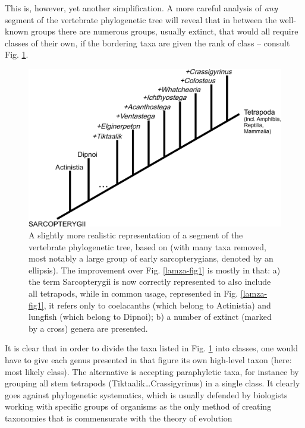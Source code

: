 \begin{artengenv}
This is, however, yet another simplification. A more careful analysis of \textit{any }segment of the vertebrate
phylogenetic tree will reveal that in between the well-known groups there are numerous groups, usually extinct, that
would all require classes of their own, if the bordering taxa are given the rank of class -- consult Fig. \ref{lamza-fig2}.

\begin{figure}[h]
	\centering
	\includegraphics[width=1\textwidth]{PAU_Lamza/Lamzaorg-img002.jpg}
	\caption{A slightly more realistic representation of a segment of the vertebrate phylogenetic tree, based on
		\parencite{swartz_marine_2012}
		(with many taxa removed, most notably a large group of early sarcopterygians,
		denoted by an ellipsis). The improvement over Fig. \ref{lamza-fig1} is mostly in that: a) the term Sarcopterygii is now correctly
		represented to also include all tetrapods, while in common usage, represented in Fig. \ref{lamza-fig1}, it refers only to coelacanths
		(which belong to Actinistia) and lungfish (which belong to Dipnoi); b) a number of extinct (marked by a cross) genera
		are presented.}
	\label{lamza-fig2}
\end{figure}

It is clear that in order to divide the taxa listed in Fig. \ref{lamza-fig2} into classes, one would have to give each genus presented
in that figure its own high-level taxon (here: most likely class). The alternative is accepting paraphyletic taxa, for
instance by grouping all stem tetrapods (Tiktaalik\ldots Crassigyrinus) in a single class. It clearly goes against
phylogenetic systematics, which is usually defended by biologists working with specific groups of organisms as the only
method of creating taxonomies that is commensurate with the theory of evolution
\parencite[see e.g.][]{williams_pursuit_2007}


\end{artengenv}
